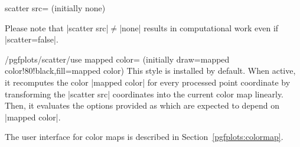 {\begin{pgfplotskey}{scatter src= (initially none)}
\begin{codeexample}
\end{codeexample}

	Please note that |scatter src|$\neq$|none| results in computational work even if |scatter=false|.
\end{pgfplotskey}

\begin{stylekey}{/pgfplots/scatter/use mapped color= (initially draw=mapped color!80!black,fill=mapped color)}
	This style is installed by default. When active, it recomputes the color |mapped color| for every processed point coordinate by transforming the |scatter src| coordinates into the current color map linearly. Then, it evaluates the options provided as  which are expected to depend on |mapped color|.

	The user interface for color maps is described in Section~\ref{pgfplots:colormap}.
\begin{codeexample}[]
\end{codeexample}

\begin{codeexample}[]
\end{codeexample}

\begin{codeexample}[]
\end{codeexample}


\end{stylekey}}
